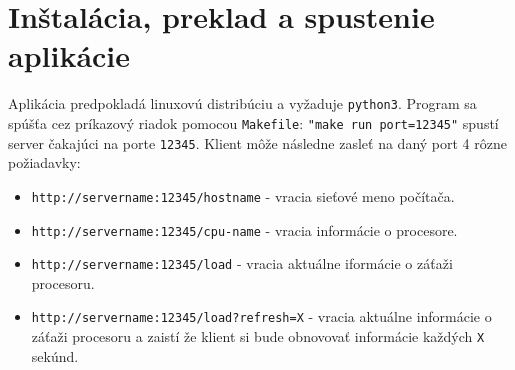 \documentclass[a4paper, 11pt]{article}
\begin{document}
\section{Inštalácia, preklad a spustenie aplikácie}
Aplikácia predpokladá linuxovú distribúciu a vyžaduje \texttt{python3}. Program sa spúšťa cez príkazový riadok pomocou \texttt{Makefile}: \texttt{"make run port=12345"} spustí server čakajúci na porte \texttt{12345}. Klient môže následne zasleť na daný port 4 rôzne požiadavky:
\begin{itemize}
	\item \texttt{http://servername:12345/hostname} - vracia sieťové meno počítača.
	\item \texttt{http://servername:12345/cpu-name} - vracia informácie o procesore.
	\item \texttt{http://servername:12345/load} - vracia aktuálne iformácie o záťaži procesoru.
	\item \texttt{http://servername:12345/load?refresh=X} - vracia aktuálne informácie o záťaži procesoru a zaistí že klient si bude obnovovať informácie každých \texttt{X} sekúnd.
\end{itemize}
\end{document}
